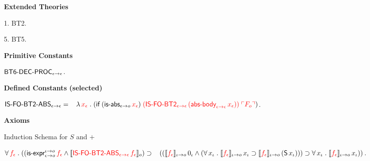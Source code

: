 \begin{biformthy}\em

\bi

  \item[]

  \item[] \textbf{Extended Theories} 

  \be

    \item[1.] BT2.

    \item[5.] BT5.

  \ee
    
  \item[] \textbf{Primitive Constants}

  \be

    \setcounter{enumi}{7}

    \item $\mbox{\sf BT6-DEC-PROC}_{\epsilon \rightarrow \epsilon}$.

  \ee

  \item[] \textbf{Defined Constants (selected)}

  \be

    \setcounter{enumi}{6}

    \item $\mbox{\sf IS-FO-BT2-ABS}_{\epsilon \rightarrow \epsilon} = {}\\
    \hspace*{2ex}\lambda\, \textcolor{red}{x_\epsilon} \mathrel. 
    (\mbox{\sf if} \; (\mbox{\sf is-abs}_{\epsilon \rightarrow o} \, \textcolor{red}{x_\epsilon}) \;
    \textcolor{red}{(\mbox{\sf IS-FO-BT2}_{\epsilon \rightarrow \epsilon} \,
    (\mbox{\sf abs-body}_{\epsilon \rightarrow \epsilon} \, x_\epsilon))} \;
    \textcolor{red}{\ulcorner F_o\urcorner})$.

  \ee

  \item[] \textbf{Axioms}

  \be

    \setcounter{enumi}{28}

    \item Induction Schema for $S$ and $+$

    $\forall\, \textcolor{red}{f_\epsilon} \mathrel. 
    ((\mbox{\sf is-expr}_{\epsilon \rightarrow o}^{\iota \rightarrow o} \, \textcolor{red}{f_\epsilon} \wedge
    \llbracket\textcolor{red}{\mbox{\sf IS-FO-BT2-ABS}_{\epsilon \rightarrow \epsilon} \, 
    f_\epsilon}\rrbracket_o) \supset {} \\
    \hspace*{2ex}((\llbracket\textcolor{red}{f_\epsilon}\rrbracket_{\iota \rightarrow o} \, 0_\iota \wedge
    (\forall\, x_\iota \mathrel. 
    \llbracket\textcolor{red}{f_\epsilon}\rrbracket_{\iota \rightarrow o} \, x_\iota \supset
    \llbracket\textcolor{red}{f_\epsilon}\rrbracket_{\iota \rightarrow o} \, 
    (\mbox{\sf S} \, x_\iota))) \supset 
    \forall\, x_\iota \mathrel. 
    \llbracket\textcolor{red}{f_\epsilon}\rrbracket_{\iota \rightarrow o} \, x_\iota))$.


\end{biformthy}
